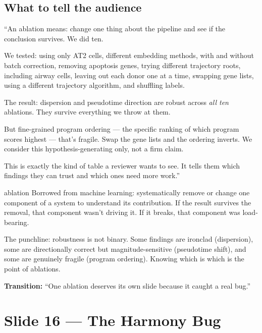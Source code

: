 \documentclass[11pt]{article}
\begin{document}
\subsection{What to tell the audience}

\begin{speaknote}
``An ablation means: change one thing about the pipeline and see if the conclusion survives. We did ten.

We tested: using only AT2 cells, different embedding methods, with and without batch correction, removing apoptosis genes, trying different trajectory roots, including airway cells, leaving out each donor one at a time, swapping gene lists, using a different trajectory algorithm, and shuffling labels.

The result: dispersion and pseudotime direction are robust across \emph{all ten} ablations. They survive everything we throw at them.

But fine-grained program ordering --- the specific ranking of which program scores highest --- that's fragile. Swap the gene lists and the ordering inverts. We consider this hypothesis-generating only, not a firm claim.

This is exactly the kind of table a reviewer wants to see. It tells them which findings they can trust and which ones need more work.''
\end{speaknote}

\begin{jargon}{ablation}
Borrowed from machine learning: systematically remove or change one component of a system to understand its contribution. If the result survives the removal, that component wasn't driving it. If it breaks, that component was load-bearing.
\end{jargon}

\begin{resultbox}
The punchline: robustness is not binary. Some findings are ironclad (dispersion), some are directionally correct but magnitude-sensitive (pseudotime shift), and some are genuinely fragile (program ordering). Knowing which is which is the point of ablations.
\end{resultbox}

\textbf{Transition:} ``One ablation deserves its own slide because it caught a real bug.''


\section{Slide 16 --- The Harmony Bug}
\end{document}
